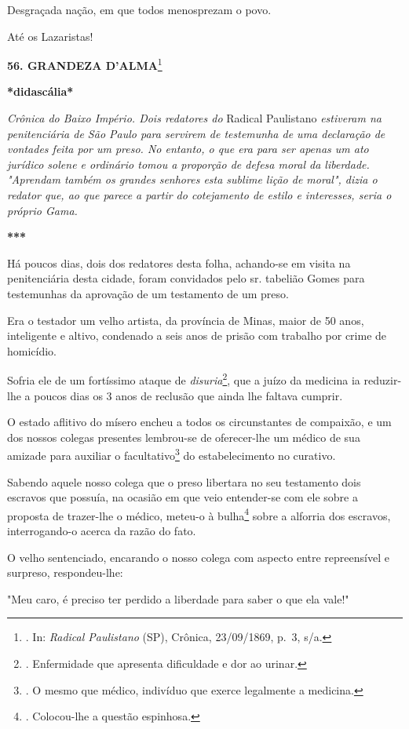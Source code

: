 Desgraçada nação, em que todos menosprezam o povo.

Até os Lazaristas!

\textbf{56. GRANDEZA D'ALMA}\footnote{. In: \emph{Radical Paulistano}
  (SP), Crônica, 23/09/1869, p.~3, s/a.}

\textbf{*didascália*}

\emph{Crônica do Baixo Império. Dois redatores do} Radical Paulistano
\emph{estiveram na penitenciária de São Paulo para servirem de
testemunha de uma declaração de vontades feita por um preso. No entanto,
o que era para ser apenas um ato jurídico solene e ordinário tomou a
proporção de defesa moral da liberdade. "Aprendam também os grandes
senhores esta sublime lição de moral", dizia o redator que, ao que
parece a partir do cotejamento de estilo e interesses, seria o próprio
Gama.}

\textbf{***}

Há poucos dias, dois dos redatores desta folha, achando-se em visita na
penitenciária desta cidade, foram convidados pelo sr. tabelião Gomes
para testemunhas da aprovação de um testamento de um preso.

Era o testador um velho artista, da província de Minas, maior de 50
anos, inteligente e altivo, condenado a seis anos de prisão com trabalho
por crime de homicídio.

Sofria ele de um fortíssimo ataque de \emph{disuria}\footnote{.
  Enfermidade que apresenta dificuldade e dor ao urinar.}, que a juízo
da medicina ia reduzir-lhe a poucos dias os 3 anos de reclusão que ainda
lhe faltava cumprir.

O estado aflitivo do mísero encheu a todos os circunstantes de
compaixão, e um dos nossos colegas presentes lembrou-se de oferecer-lhe
um médico de sua amizade para auxiliar o facultativo\footnote{. O mesmo
  que médico, indivíduo que exerce legalmente a medicina.} do
estabelecimento no curativo.

Sabendo aquele nosso colega que o preso libertara no seu testamento dois
escravos que possuía, na ocasião em que veio entender-se com ele sobre a
proposta de trazer-lhe o médico, meteu-o à bulha\footnote{. Colocou-lhe
  a questão espinhosa.} sobre a alforria dos escravos, interrogando-o
acerca da razão do fato.

O velho sentenciado, encarando o nosso colega com aspecto entre
repreensível e surpreso, respondeu-lhe:

"Meu caro, é preciso ter perdido a liberdade para saber o que ela vale!"


